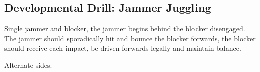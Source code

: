 \subsection*{Developmental Drill: Jammer Juggling}
\label{drill:one_on_one/developmental/jammer_juggling}

Single jammer and blocker, the jammer begins behind the blocker disengaged. 
The jammer should sporadically hit and bounce the blocker forwards, the blocker should receive each impact, be driven forwards legally and maintain balance. 


Alternate sides.

